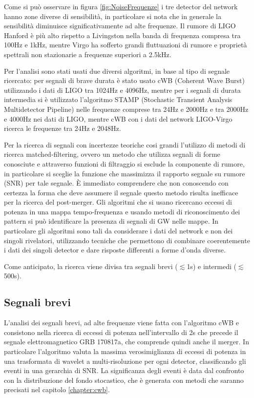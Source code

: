Come si può osservare in figura \ref{fig:NoiseFrequenze} i tre detector del network hanno zone diverse di sensibilità, in particolare si nota che in generale la sensibilità diminuisce significativamente ad alte frequenze. Il rumore di LIGO Hanford è più alto rispetto a Livingston nella banda di frequenza compresa tra 100Hz e 1kHz, mentre Virgo ha sofferto grandi fluttuazioni di rumore e proprietà spettrali non stazionarie a frequenze superiori a 2.5kHz.

Per l'analisi sono stati usati due diversi algoritmi, in base al tipo di segnale ricercato: per segnali di brave durata è stato usato cWB (Coherent Wave Burst) utilizzando i dati di LIGO tra 1024Hz e 4096Hz, mentre per i segnali di durata intermedia si è utilizzato l'algoritmo STAMP (Stochastic Transient Analysis Multidetector Pipeline) nelle frequenze comprese tra 24Hz e 2000Hz e tra 2000Hz e 4000Hz nei dati di LIGO, mentre cWB con i dati del network LIGO-Virgo ricerca le frequenze tra 24Hz e 2048Hz. 

Per la ricerca di segnali con incertezze teoriche cosi grandi l'utilizzo di metodi di ricerca matched-filtering, ovvero un metodo che utilizza segnali di forme conosciute e attraverso funzioni di filtraggio si esclude la componente di rumore, in particolare si sceglie la funzione che massimizza il rapporto segnale su rumore (SNR) per tale segnale\cite{maggiore2008gravitational}. È immediato comprendere che non conoscendo con certezza la forma che deve assumere il segnale questo metodo risulta inefficace per la ricerca del post-merger. Gli algoritmi che si usano ricercano eccessi di potenza in una mappa tempo-frequenza e usando metodi di riconoscimento dei pattern si può identificare la presenza di segnali di GW nelle mappe. In particolare gli algoritmi sono tali da considerare i dati del network e non dei singoli rivelatori, utilizzando tecniche che permettono di combinare coerentemente i dati dei singoli detector e dare risposte differenti a forme d'onda diverse.

Come anticipato, la ricerca viene divisa tra segnali brevi ($\lesssim$1s) e intermedi ($\lesssim$500s).
\subsection{Segnali brevi}
L'analisi dei segnali brevi, ad alte frequenze viene fatta con l'algoritmo cWB e consistono nella ricerca di eccessi di potenza nell'intervallo di 2s che precede il segnale elettromagnetico GRB 170817a, che comprende quindi anche il merger.
In particolare l'algoritmo valuta la massima verosimiglianza di eccessi di potenza in una trasformata di wavelet a multi-risoluzione per ogni detector, classificando gli eventi in una gerarchia di SNR. La significanza degli eventi è data dal confronto con la distribuzione del fondo stocastico, che è generata con metodi che saranno precisati nel capitolo \ref{chapter:cwb}. 

